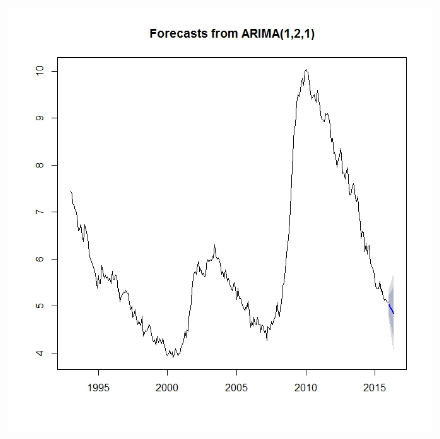 \documentclass[twoside,twocolumn]{article}
\begin{document}
\begin{figure}[H]
     	\includegraphics[width=.9\linewidth]{images/fore4}
 \end{figure}
\end{document}
